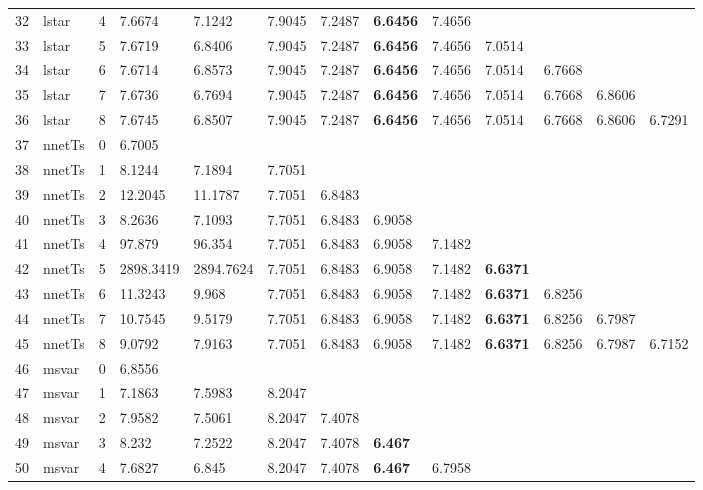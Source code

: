 \documentclass[10pt,a4paper]{article}
\begin{document}
\begin{table}[ht]
\begin{tabular}{rlrllllllllll}
  32 & lstar &     4 & 7.6674 & 7.1242 & 7.9045 & 7.2487 & \textbf{6.6456} & 7.4656 &  &  &  &  \\ 
  33 & lstar &     5 & 7.6719 & 6.8406 & 7.9045 & 7.2487 & \textbf{6.6456} & 7.4656 & 7.0514 &  &  &  \\ 
  34 & lstar &     6 & 7.6714 & 6.8573 & 7.9045 & 7.2487 & \textbf{6.6456} & 7.4656 & 7.0514 & 6.7668 &  &  \\ 
  35 & lstar &     7 & 7.6736 & 6.7694 & 7.9045 & 7.2487 & \textbf{6.6456} & 7.4656 & 7.0514 & 6.7668 & 6.8606 &  \\ 
  36 & lstar &     8 & 7.6745 & 6.8507 & 7.9045 & 7.2487 & \textbf{6.6456} & 7.4656 & 7.0514 & 6.7668 & 6.8606 & 6.7291 \\ 
   \hline
37 & nnetTs &     0 & 6.7005 &  &  &  &  &  &  &  &  &  \\ 
  38 & nnetTs &     1 & 8.1244 & 7.1894 & 7.7051 &  &  &  &  &  &  &  \\ 
  39 & nnetTs &     2 & 12.2045 & 11.1787 & 7.7051 & 6.8483 &  &  &  &  &  &  \\ 
  40 & nnetTs &     3 & 8.2636 & 7.1093 & 7.7051 & 6.8483 & 6.9058 &  &  &  &  &  \\ 
  41 & nnetTs &     4 & 97.879 & 96.354 & 7.7051 & 6.8483 & 6.9058 & 7.1482 &  &  &  &  \\ 
  42 & nnetTs &     5 & 2898.3419 & 2894.7624 & 7.7051 & 6.8483 & 6.9058 & 7.1482 & \textbf{6.6371} &  &  &  \\ 
  43 & nnetTs &     6 & 11.3243 & 9.968 & 7.7051 & 6.8483 & 6.9058 & 7.1482 & \textbf{6.6371} & 6.8256 &  &  \\ 
  44 & nnetTs &     7 & 10.7545 & 9.5179 & 7.7051 & 6.8483 & 6.9058 & 7.1482 & \textbf{6.6371} & 6.8256 & 6.7987 &  \\ 
  45 & nnetTs &     8 & 9.0792 & 7.9163 & 7.7051 & 6.8483 & 6.9058 & 7.1482 & \textbf{6.6371} & 6.8256 & 6.7987 & 6.7152 \\ 
   \hline
46 & msvar &     0 & 6.8556 &  &  &  &  &  &  &  &  &  \\ 
  47 & msvar &     1 & 7.1863 & 7.5983 & 8.2047 &  &  &  &  &  &  &  \\ 
  48 & msvar &     2 & 7.9582 & 7.5061 & 8.2047 & 7.4078 &  &  &  &  &  &  \\ 
  49 & msvar &     3 & 8.232 & 7.2522 & 8.2047 & 7.4078 & \textbf{6.467} &  &  &  &  &  \\ 
  50 & msvar &     4 & 7.6827 & 6.845 & 8.2047 & 7.4078 & \textbf{6.467} & 6.7958 &  &  &  &  \\ 

\end{tabular}
\end{table}
\end{document}
